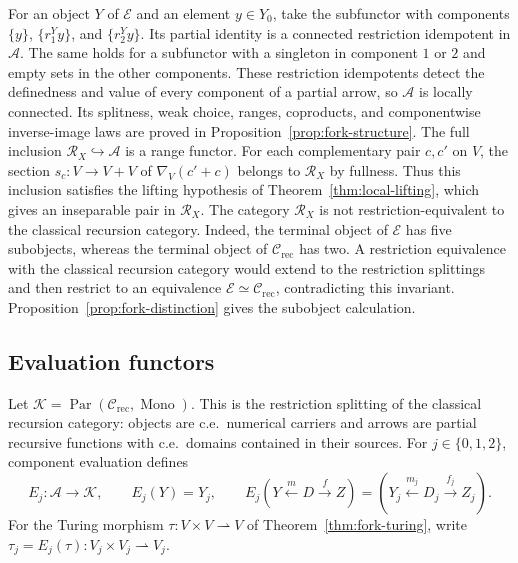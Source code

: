 \documentclass[11pt]{article}
\begin{document}
For an object $Y$ of $\mathcal E$ and an element $y\in Y_0$, take
the subfunctor with components $\{y\}$, $\{r_1^Yy\}$, and
$\{r_2^Yy\}$. Its partial identity is a connected restriction
idempotent in $\mathcal A$. The same holds for a subfunctor with
a singleton in component $1$ or $2$ and empty sets in the other
components. These restriction idempotents detect the definedness and value
of every component of a partial arrow, so $\mathcal A$ is locally
connected. Its splitness, weak choice, ranges, coproducts, and
componentwise inverse-image laws are proved in
Proposition~\ref{prop:fork-structure}.
The full inclusion $\mathscr R_X\hookrightarrow\mathcal A$ is a
range functor.
For each complementary pair $c,c'$ on $V$, the section
$s_c:V\to V+V$ of $\nabla_V(c'+c)$ belongs to $\mathscr R_X$
by fullness. Thus this inclusion satisfies the lifting hypothesis of
Theorem~\ref{thm:local-lifting}, which gives an inseparable pair in
$\mathscr R_X$.
The category $\mathscr R_X$ is not restriction-equivalent to the
classical recursion category. Indeed, the terminal object of
$\mathcal E$ has five subobjects, whereas the terminal object of
$\mathcal C_{\mathrm{rec}}$ has two.
A restriction equivalence with the classical recursion category
would extend to the restriction splittings and then restrict to an
equivalence $\mathcal E\simeq\mathcal C_{\mathrm{rec}}$, contradicting
this invariant. Proposition~\ref{prop:fork-distinction} gives the
subobject calculation.

\subsection{Evaluation functors}

Let
$\mathcal K=\operatorname{Par}(\mathcal C_{\mathrm{rec}},\operatorname{Mono})$.
This is the restriction splitting of the classical recursion category:
objects are c.e.\ numerical carriers and arrows are partial recursive
functions with c.e.\ domains contained in their sources.
For $j\in\{0,1,2\}$, component evaluation defines
\begin{equation}\label{eq:endpoint-functor}
 E_j:\mathcal A\longrightarrow\mathcal K,\qquad
 E_j(Y)=Y_j,\qquad
 E_j(Y\xleftarrow{m}D\xrightarrow{f}Z)
   =(Y_j\xleftarrow{m_j}D_j\xrightarrow{f_j}Z_j).
\end{equation}
For the Turing morphism $\tau:V\times V\rightharpoonup V$ of
Theorem~\ref{thm:fork-turing}, write
$\tau_j=E_j(\tau):V_j\times V_j\rightharpoonup V_j$.
\end{document}
